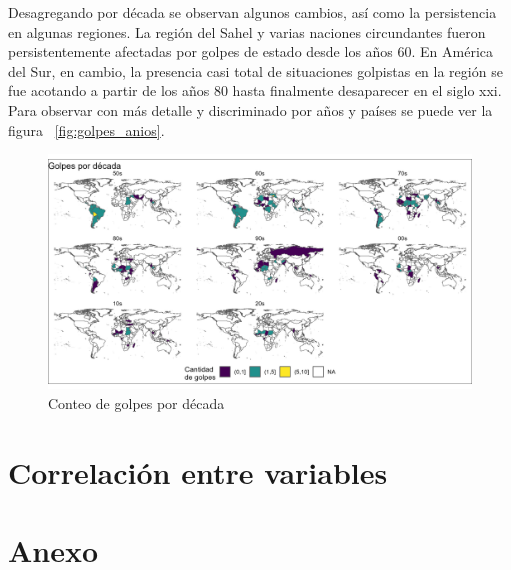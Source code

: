 \documentclass{article}
\begin{document}
Desagregando por década se observan algunos cambios, así como la persistencia en algunas
regiones. La región del Sahel y varias naciones circundantes fueron persistentemente afectadas
por golpes de estado desde los años 60. En América del Sur, en cambio, la presencia casi total
de situaciones golpistas en la región se fue acotando a partir de los años 80 hasta finalmente
desaparecer en el siglo xxi. Para observar con más detalle y discriminado por años y países se
puede ver la figura ~\ref{fig:golpes_anios}.

\begin{figure}[H]
  \centering  
  \includegraphics[width=1\textwidth]{3_golpes_decadas.png}
  \caption{Conteo de golpes por década}
\end{figure}


\section{Correlación entre variables}



\section{Anexo}
\end{document}
